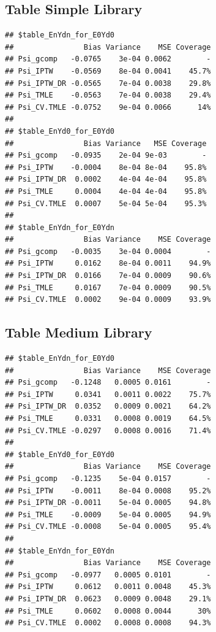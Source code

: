 \documentclass[11pt]{article}\usepackage[]{graphicx}\usepackage[]{color}
\makeatletter
\newenvironment{kframe}{%
 \def\at@end@of@kframe{}%
 \ifinner\ifhmode%
  \def\at@end@of@kframe{\end{minipage}}%
  \begin{minipage}{\columnwidth}%
 \fi\fi%
 \def\FrameCommand##1{\hskip\@totalleftmargin \hskip-\fboxsep
 \colorbox{shadecolor}{##1}\hskip-\fboxsep
     \hskip-\linewidth \hskip-\@totalleftmargin \hskip\columnwidth}%
 \MakeFramed {\advance\hsize-\width
   \@totalleftmargin\z@ \linewidth\hsize
   \@setminipage}}%
 {\par\unskip\endMakeFramed%
 \at@end@of@kframe}
\newenvironment{knitrout}{}{} %
\makeatother
\begin{document}
\subsection{Table Simple Library}
\begin{knitrout}
\color{fgcolor}\begin{kframe}
\begin{verbatim}
## $table_EnYdn_for_E0Yd0
##                Bias Variance    MSE Coverage
## Psi_gcomp   -0.0765    3e-04 0.0062        -
## Psi_IPTW    -0.0569    8e-04 0.0041    45.7%
## Psi_IPTW_DR -0.0565    7e-04 0.0038    29.8%
## Psi_TMLE    -0.0563    7e-04 0.0038    29.4%
## Psi_CV.TMLE -0.0752    9e-04 0.0066      14%
## 
## $table_EnYd0_for_E0Yd0
##                Bias Variance   MSE Coverage
## Psi_gcomp   -0.0935    2e-04 9e-03        -
## Psi_IPTW    -0.0004    8e-04 8e-04    95.8%
## Psi_IPTW_DR  0.0002    4e-04 4e-04    95.8%
## Psi_TMLE     0.0004    4e-04 4e-04    95.8%
## Psi_CV.TMLE  0.0007    5e-04 5e-04    95.3%
## 
## $table_EnYdn_for_E0Ydn
##                Bias Variance    MSE Coverage
## Psi_gcomp   -0.0035    3e-04 0.0004        -
## Psi_IPTW     0.0162    8e-04 0.0011    94.9%
## Psi_IPTW_DR  0.0166    7e-04 0.0009    90.6%
## Psi_TMLE     0.0167    7e-04 0.0009    90.5%
## Psi_CV.TMLE  0.0002    9e-04 0.0009    93.9%
\end{verbatim}
\end{kframe}
\end{knitrout}
\subsection{Table Medium Library}
\begin{knitrout}
\color{fgcolor}\begin{kframe}
\begin{verbatim}
## $table_EnYdn_for_E0Yd0
##                Bias Variance    MSE Coverage
## Psi_gcomp   -0.1248   0.0005 0.0161        -
## Psi_IPTW     0.0341   0.0011 0.0022    75.7%
## Psi_IPTW_DR  0.0352   0.0009 0.0021    64.2%
## Psi_TMLE     0.0331   0.0008 0.0019    64.5%
## Psi_CV.TMLE -0.0297   0.0008 0.0016    71.4%
## 
## $table_EnYd0_for_E0Yd0
##                Bias Variance    MSE Coverage
## Psi_gcomp   -0.1235    5e-04 0.0157        -
## Psi_IPTW    -0.0011    8e-04 0.0008    95.2%
## Psi_IPTW_DR -0.0011    5e-04 0.0005    94.8%
## Psi_TMLE    -0.0009    5e-04 0.0005    94.9%
## Psi_CV.TMLE -0.0008    5e-04 0.0005    95.4%
## 
## $table_EnYdn_for_E0Ydn
##                Bias Variance    MSE Coverage
## Psi_gcomp   -0.0977   0.0005 0.0101        -
## Psi_IPTW     0.0612   0.0011 0.0048    45.3%
## Psi_IPTW_DR  0.0623   0.0009 0.0048    29.1%
## Psi_TMLE     0.0602   0.0008 0.0044      30%
## Psi_CV.TMLE  0.0002   0.0008 0.0008    94.3%
\end{verbatim}
\end{kframe}
\end{knitrout}
\end{document}
